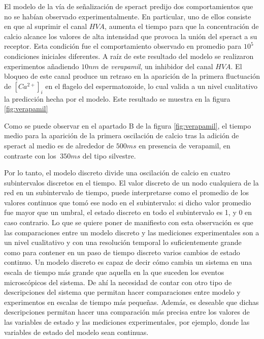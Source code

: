 El modelo de la vía de señalización de speract predijo dos comportamientos que no se habían observado experimentalmente. En particular, uno de ellos consiste en que al suprimir el canal $HVA$, aumenta el tiempo para que la concentración de calcio alcance los valores de alta intensidad que provoca la unión del speract a su receptor. Esta condición fue el comportamiento observado en promedio para $10^5$ condiciones iniciales diferentes. A raíz de este resultado del modelo se realizaron experimentos añadiendo $10  nm$ de \emph{verapamil}, un inhibidor del canal $HVA$. El bloqueo de este canal produce un retraso en la aparición de la primera fluctuación de $[Ca^{2+}]_i$ en el flagelo del espermatozoide, lo cual valida a un nivel cualitativo la predicción hecha por el modelo. Este resultado se muestra en la figura \ref{fig:verapamil}

Como se puede observar en el apartado B de la figura \ref{fig:verapamil}, el tiempo medio para la aparición de la primera oscilación de calcio tras la adición de speract al medio es de alrededor de $500 ms$ en presencia de verapamil, en contraste con los $~350 ms$ del tipo silvestre. 


Por lo tanto, el modelo discreto divide una oscilación de calcio en cuatro subintervalos discretos en el tiempo. El valor discreto de un nodo cualquiera de la red en un  subintervalo de tiempo, puede interpretarse como el promedio de los valores continuos que tomó ese nodo en el subintervalo: si dicho valor promedio fue mayor que un umbral, el estado discreto en todo el subintervalo es 1, y 0 en caso contrario. Lo que se quiere poner de manifiesto con esta observación es que las comparaciones entre un modelo discreto y las mediciones experimentales son a un nivel cualitativo y con una resolución temporal lo suficientemente grande como para contener en un paso de tiempo discreto varios cambios de estado continuo. Un modelo discreto es capaz de decir cómo cambia un sistema en una escala de tiempo más grande que aquella en la que suceden los eventos microscópicos del sistema. De ahí la necesidad de contar con otro tipo de descripciones del sistema que permitan hacer comparaciones entre modelo y experimentos en escalas de tiempo más pequeñas. Además, es deseable que dichas descripciones permitan hacer una comparación más precisa entre los valores de las variables de estado y las mediciones experimentales, por ejemplo, donde las variables de estado del modelo sean continuas.

